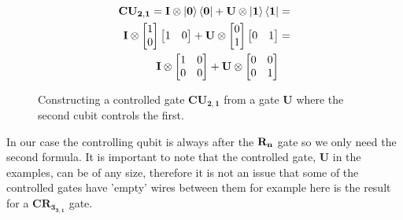 \begin{figure}[H]
    \begin{align*}
        \mathbf{CU_{2,1}}=\mathbf{I}\otimes\ket{\mathbf{0}}\bra{\mathbf{0}} + \mathbf{U}\otimes\ket{\mathbf{1}}\bra{\mathbf{1}}&=\\
        \mathbf{I}\otimes
        \begin{bmatrix}
            1 \\
            0 \\
        \end{bmatrix}
        \begin{bmatrix}
            1 & 0 \\
        \end{bmatrix}+
        \mathbf{U}\otimes
        \begin{bmatrix}
            0 \\
            1 \\
        \end{bmatrix}
        \begin{bmatrix}
            0 & 1 \\
        \end{bmatrix}
        &=\\
        \mathbf{I}\otimes
        \begin{bmatrix}
            1 & 0 \\
            0 & 0 \\
        \end{bmatrix}+ 
        \mathbf{U}\otimes
        \begin{bmatrix}
            0 & 0 \\
            0 & 1 \\
        \end{bmatrix}& 
    \end{align*}
    \caption{Constructing a controlled gate $\mathbf{CU_{2,1}}$ from a gate $\mathbf{U}$ where the second cubit controls the first. }
    \label{fig:CU1}
\end{figure}
\noindent
In our case the controlling qubit is always after the $\mathbf{R_{n}}$ gate so we only need the second formula. 
It is important to note that the controlled gate, $\mathbf{U}$ in the examples, can be of any size, therefore it is not an issue that some of the controlled gates have 'empty' wires between them for example here is the result for a $\mathbf{CR_{3_{3,1}}}$ gate. 
